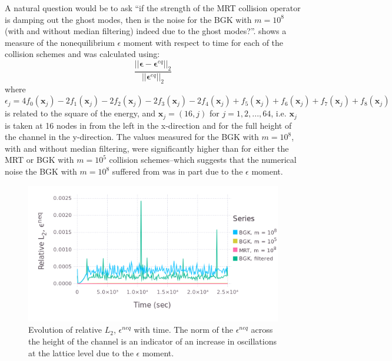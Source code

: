 \documentclass[pdftex,ms]{pittetd}
\newcommand{\pos}{\mathbf{x}}
\begin{document}
A natural question would be to ask ``if the strength of the MRT collision operator is damping out the ghost modes, then is the noise for the BGK with $m = 10^8$ (with and without median filtering) indeed due to the ghost modes?''.
 shows a measure of the nonequilibrium $\epsilon$ moment with respect to time for each of the collision schemes and was calculated using:
\begin{equation}
\frac{||\boldsymbol{\epsilon} - \boldsymbol{\epsilon}^{eq}||_2}{||\boldsymbol{\epsilon}^{eq}||_2}
\end{equation}
\noindent where $\epsilon_j = 4f_0(\pos_j) - 2f_1(\pos_j) - 2f_2(\pos_j) - 2f_3(\pos_j) - 2f_4(\pos_j) + f_5(\pos_j) + f_6(\pos_j) + f_7(\pos_j) + f_8(\pos_j)$ is related to the square of the energy, and $\pos_j = (16, j)$ for $j = 1, 2, ..., 64$, i.e. $\pos_j$ is taken at 16 nodes in from the left in the x-direction and for the full height of the channel in the y-direction.
The values measured for the BGK with $m = 10^8$, with and without median filtering, were significantly higher than for either the MRT or BGK with $m = 10^5$ collision schemes--which suggests that the numerical noise the BGK with $m = 10^8$ suffered from was in part due to the $\epsilon$ moment.

\begin{figure}
	\centering
    \includegraphics[width=\linewidth]{figs/poise-bingham/epsilon}
    \caption{Evolution of relative $L_2$, $\epsilon^{neq}$ with time. The norm of the $\epsilon^{neq}$ across the height of the channel is an indicator of an increase in oscillations at the lattice level due to the $\epsilon$ moment.}
    \label{fig:epsilon}
\end{figure}
\end{document}
